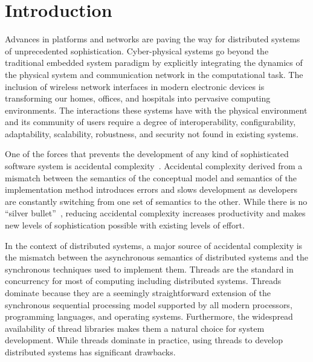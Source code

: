 \section{Introduction}

Advances in platforms and networks are paving the way for distributed systems of unprecedented sophistication.
Cyber-physical systems go beyond the traditional embedded system paradigm by explicitly integrating the dynamics of the physical system and communication network in the computational task.
The inclusion of wireless network interfaces in modern electronic devices is transforming our homes, offices, and hospitals into pervasive computing environments.
The interactions these systems have with the physical environment and its community of users require a degree of interoperability, configurability, adaptability, scalability, robustness, and security not found in existing systems.

One of the forces that prevents the development of any kind of sophisticated software system is accidental complexity~\cite{brooks_nsb}.
Accidental complexity derived from a mismatch between the semantics of the conceptual model and semantics of the implementation method introduces errors and slows development as developers are constantly switching from one set of semantics to the other.
While there is no ``silver bullet''~\cite{brooks_nsb}, reducing accidental complexity increases productivity and makes new levels of sophistication possible with existing levels of effort.

In the context of distributed systems, a major source of accidental complexity is the mismatch between the asynchronous semantics of distributed systems and the synchronous techniques used to implement them.
Threads are the standard in concurrency for most of computing including distributed systems.
Threads dominate because they are a seemingly straightforward extension of the synchronous sequential processing model supported by all modern processors, programming languages, and operating systems.
Furthermore, the widespread availability of thread libraries makes them a natural choice for system development.
While threads dominate in practice, using threads to develop distributed systems has significant drawbacks.


